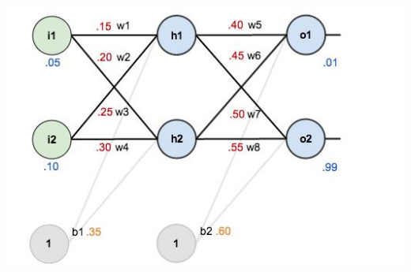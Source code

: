 \documentclass[12pt]{article}
\begin{document}
\begin{center}
\includegraphics{Backpropagation_Example3} 
\end{center}
\end{document}
